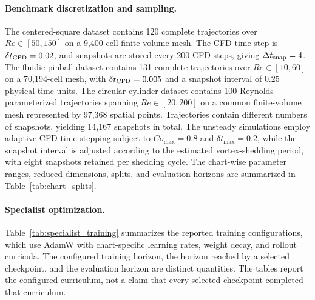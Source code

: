 \documentclass{article}
\begin{document}
\paragraph{Benchmark discretization and sampling.}
The centered-square dataset contains 120 complete trajectories over
$Re\in[50,150]$ on a 9,400-cell finite-volume mesh. The CFD time step is $\delta t_{\rm CFD}=0.02$, and snapshots are stored every 200 CFD steps, giving $\Delta t_{\rm snap}=4$. The fluidic-pinball dataset contains 131 complete trajectories over $Re\in[10,60]$ on a 70,194-cell mesh, with $\delta t_{\rm CFD}=0.005$ and a snapshot interval of $0.25$ physical time units. The circular-cylinder dataset contains 100 Reynolds-parameterized trajectories spanning
$Re\in[20,200]$ on a common finite-volume mesh represented by 97,368 spatial points. Trajectories contain different numbers of snapshots, yielding 14,167 snapshots in total. The unsteady simulations employ adaptive CFD time stepping subject to $Co_{\max}=0.8$ and $\delta t_{\max}=0.2$, while the snapshot interval is adjusted according to the estimated vortex-shedding period, with eight snapshots retained per shedding cycle. The chart-wise parameter ranges, reduced dimensions, splits, and evaluation horizons are summarized in Table~\ref{tab:chart_splits}.


\paragraph{Specialist optimization.}
Table~\ref{tab:specialist_training} summarizes the reported training configurations, which use AdamW with chart-specific learning rates, weight decay, and rollout curricula.
The configured training horizon, the horizon reached by a selected checkpoint, and the evaluation horizon are distinct quantities. The tables report the configured curriculum, not a claim that every selected checkpoint completed that curriculum.
\end{document}
